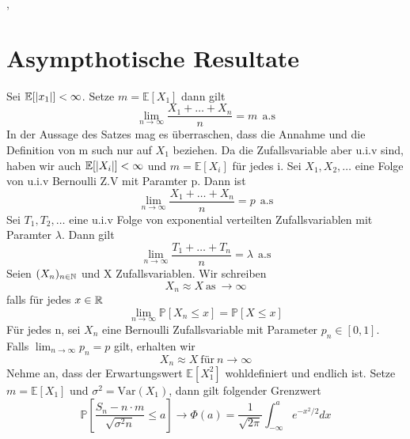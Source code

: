 \sep
\section{Asympthotische Resultate}
\Theo[6.1] \newline
Sei \( \mathbb{E}[\left\lvert x_1 \right\rvert] < \infty \). Setze \(m = \mathbb{E}[X_1]\) dann gilt \[ \lim_{n \rightarrow \infty} \frac{X_1 + \dots + X_n}{n} = m \ \ \text{a.s}\]
\Bem[6.2] \newline
In der Aussage des Satzes mag es überraschen, dass die Annahme und die Definition von m such nur auf \(X_1\) beziehen. Da die Zufallsvariable aber u.i.v sind, haben wir auch \( \mathbb{E}[\left\lvert X_i \right\rvert] < \infty \) und \(m = \mathbb{E}[X_i]\) für jedes i. \newline
\Bsp[6.2A] \newline
Sei \(X_1, X_2, \dots \) eine Folge von u.i.v Bernoulli Z.V mit Paramter p. Dann ist \[ \lim_{n \rightarrow  \infty } \frac{X_1 + \dots + X_n }{n} = p \ \ \text{a.s}\]
\Bsp[6.2B] \newline
Sei \(T_1, T_2, \dots \) eine u.i.v Folge von exponential verteilten Zufallsvariablen mit Paramter \( \lambda \). Dann gilt \[ \lim_{n \rightarrow \infty} \frac{T_1 + \dots + T_n }{n} = \lambda \ \ \text{a.s}\]
\Def[6.3] \newline
Seien \( (X_n)_{n \in \mathbb{N} }\) und X Zufallsvariablen. Wir schreiben \[X_n \approx X \ \text{as} \ \rightarrow \infty \]
falls für jedes \( x \in \mathbb{R} \) \[\lim_{n \rightarrow \infty } \mathbb{P}[X_n \leq x ] = \mathbb{P}[X \leq x]\]
\Bsp[6.3A] \newline
Für jedes n, sei \(X_n \) eine Bernoulli Zufallsvariable mit Parameter \(p_n \in [0,1 ]\). Falls \( \lim_{n \rightarrow \infty } p_n = p \) gilt, erhalten wir \[X_n \approx X \ \text{für} \ n \rightarrow \infty\] 
\Theo[6.4 ZGWS] \newline
Nehme an, dass der Erwartungswert \(\mathbb{E}[X_1^2]\) wohldefiniert und endlich ist. Setze \(m = \mathbb{E}[X_1]\) und \( \sigma^2 = \text{Var}(X_1)\), dann gilt folgender Grenzwert \[ \mathbb{P}[\frac{S_n - n \cdot m }{\sqrt{\sigma^2n}} \leq a] \rightarrow \Phi(a) = \frac{1}{\sqrt{2 \pi}} \int_{-\infty}^{a} e^{-x^2/2}dx\]